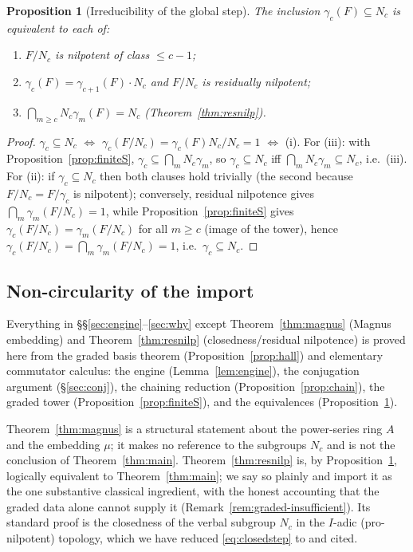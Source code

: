 \documentclass{amsart}
\newtheorem{proposition}{Proposition}
\theoremstyle{definition}
\theoremstyle{remark}
\begin{document}
\begin{proposition}[Irreducibility of the global step]\label{prop:irreducible}
The inclusion $\gamma_c(F)\subseteq N_c$ is equivalent to each of:
\begin{enumerate}
\item[\textup{(i)}] $F/N_c$ is nilpotent of class $\le c-1$;
\item[\textup{(ii)}] $\gamma_{c}(F)=\gamma_{c+1}(F)\cdot N_c$ \emph{and} $F/N_c$ is
residually nilpotent;
\item[\textup{(iii)}] $\bigcap_{m\ge c}N_c\gamma_m(F)=N_c$
\textup{(Theorem~\ref{thm:resnilp})}.
\end{enumerate}
\end{proposition}
\begin{proof}
$\gamma_c\subseteq N_c$ $\Leftrightarrow$ $\gamma_c(F/N_c)=\gamma_c(F)N_c/N_c=1$
$\Leftrightarrow$ (i). For (iii): with Proposition~\ref{prop:finiteS},
$\gamma_c\subseteq\bigcap_m N_c\gamma_m$, so $\gamma_c\subseteq N_c$ iff
$\bigcap_m N_c\gamma_m\subseteq N_c$, i.e.\ (iii). For (ii): if $\gamma_c\subseteq
N_c$ then both clauses hold trivially (the second because $F/N_c=F/\gamma_c$ is
nilpotent); conversely, residual nilpotence gives
$\bigcap_m\gamma_m(F/N_c)=1$, while Proposition~\ref{prop:finiteS} gives
$\gamma_c(F/N_c)=\gamma_m(F/N_c)$ for all $m\ge c$ (image of the tower), hence
$\gamma_c(F/N_c)=\bigcap_m\gamma_m(F/N_c)=1$, i.e.\ $\gamma_c\subseteq N_c$.
\end{proof}

\subsection*{Non-circularity of the import}

Everything in \S\S\ref{sec:engine}--\ref{sec:why} except Theorem~\ref{thm:magnus}
(Magnus embedding) and Theorem~\ref{thm:resnilp} (closedness/residual nilpotence) is
proved here from the graded basis theorem (Proposition~\ref{prop:hall}) and
elementary commutator calculus: the engine (Lemma~\ref{lem:engine}), the
conjugation argument (\S\ref{sec:conj}), the chaining reduction
(Proposition~\ref{prop:chain}), the graded tower (Proposition~\ref{prop:finiteS}),
and the equivalences (Proposition~\ref{prop:irreducible}).

Theorem~\ref{thm:magnus} is a structural statement about the power-series ring $A$
and the embedding $\mu$; it makes no reference to the subgroups $N_c$ and is not the
conclusion of Theorem~\ref{thm:main}. Theorem~\ref{thm:resnilp} is, by
Proposition~\ref{prop:irreducible}, logically equivalent to Theorem~\ref{thm:main};
we say so plainly and import it as the one substantive classical ingredient, with the
honest accounting that the graded data alone cannot supply it
(Remark~\ref{rem:graded-insufficient}). Its standard proof is the closedness of the
verbal subgroup $N_c$ in the $I$-adic (pro-nilpotent) topology, which we have
reduced \eqref{eq:closedstep} to and cited.
\end{document}

